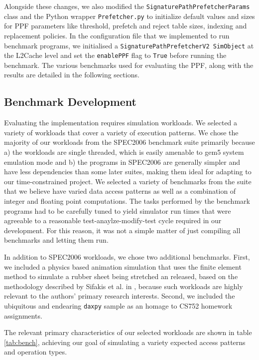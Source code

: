 \documentclass[10pt,conference]{IEEEtran}
\begin{document}
Alongside these changes, we also modified the \texttt{SignaturePathPrefetcherParams} class and the Python wrapper \texttt{Prefetcher.py} to initialize default values and sizes for PPF parameters like threshold, prefetch and reject table sizes, indexing and replacement policies. In the configuration file that we implemented to run benchmark programs, we initialised a \texttt{SignaturePathPrefetcherV2 SimObject} at the L2Cache level and set the \texttt{enablePPF} flag to \texttt{True} before running the benchmark. The various benchmarks used for evaluating the PPF, along with the results are detailed in the following sections.

\subsection{Benchmark Development}
Evaluating the implementation requires simulation workloads. We selected a variety of workloads that cover a variety of execution patterns. We chose the majority of our workloads from the SPEC2006 benchmark suite \cite{spec2006} primarily because a) the workloads are single threaded, which is easily amenable to gem5 system emulation mode and b) the programs in SPEC2006 are generally simpler and have less dependencies than some later suites, making them ideal for adapting to our time-constrained project. We selected a variety of benchmarks from the suite that we believe have varied data access patterns as well as a combination of integer and floating point computations. The tasks performed by the benchmark programs had to be carefully tuned to yield simulator run times that were agreeable to a reasonable test-anaylze-modify-test cycle required in our development. For this reason, it was not a simple matter of just compiling all benchmarks and letting them run.

In addition to SPEC2006 workloads, we chose two additional benchmarks. First, we included a physics based animation simulation that uses the finite element method to simulate a rubber sheet being stretched an released, based on the methodology described by Sifakis et al. in \cite{sifakis2012}, because such workloads are highly relevant to the authors' primary research interests. Second, we included the ubiquitous and endearing \texttt{daxpy} sample as an homage to CS752 homework assignments.

The relevant primary characteristics of our selected workloads are shown in table \ref{tab:bench}, achieving our goal of simulating a variety expected access patterns and operation types.
\end{document}
